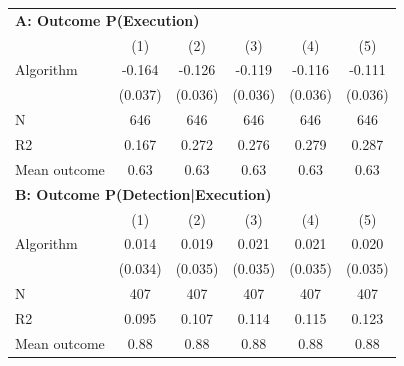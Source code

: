 \begin{tabular}{lccccc} \toprule
\multicolumn{6}{l}{\textbf{A: Outcome P(Execution)}} \\ \multicolumn{1}{l}{} & (1) & (2) & (3) & (4) & (5) \\ \midrule
Algorithm   &      -0.164\sym{***}&      -0.126\sym{***}&      -0.119\sym{***}&      -0.116\sym{***}&      -0.111\sym{***}\\
            &     (0.037)         &     (0.036)         &     (0.036)         &     (0.036)         &     (0.036)         \\
\midrule
N           &         646         &         646         &         646         &         646         &         646         \\
R2          &       0.167         &       0.272         &       0.276         &       0.279         &       0.287         \\
Mean outcome&        0.63         &        0.63         &        0.63         &        0.63         &        0.63         \\

\midrule \multicolumn{6}{l}{\textbf{B: Outcome P(Detection|Execution)}} \\ \multicolumn{1}{l}{} & (1) & (2) & (3) & (4) & (5) \\ \midrule
Algorithm   &       0.014         &       0.019         &       0.021         &       0.021         &       0.020         \\
            &     (0.034)         &     (0.035)         &     (0.035)         &     (0.035)         &     (0.035)         \\
\midrule
N           &         407         &         407         &         407         &         407         &         407         \\
R2          &       0.095         &       0.107         &       0.114         &       0.115         &       0.123         \\
Mean outcome&        0.88         &        0.88         &        0.88         &        0.88         &        0.88         \\


\end{tabular}
